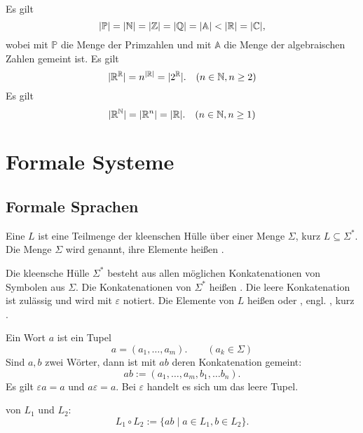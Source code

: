 Es gilt
\begin{equation}
|\mathbb P| = |\mathbb N| = |\mathbb Z| = |\mathbb Q| = |\mathbb A| < |\mathbb R| = |\mathbb C|,
\end{equation}
wobei mit $\mathbb P$ die Menge der Primzahlen und mit $\mathbb A$ die
Menge der algebraischen Zahlen gemeint ist. Es gilt
\begin{equation}
|\mathbb R^\mathbb R| = n^{|\mathbb R|} = |2^\mathbb R|.\quad (n\in\mathbb N, n\ge 2)
\end{equation}
Es gilt
\begin{equation}
|\mathbb R^\mathbb N| = |\mathbb R^n| = |\mathbb R|.\quad (n\in\mathbb N, n\ge 1)
\end{equation}

\newpage
\section{Formale Systeme}
\subsection{Formale Sprachen}
\begin{definition}\mbox{}\newline
Eine  $L$ ist eine Teilmenge der kleenschen
Hülle über einer Menge $\Sigma$, kurz $L\subseteq\Sigma^*$.
Die Menge $\Sigma$ wird  genannt,
ihre Elemente heißen .

Die kleensche Hülle $\Sigma^*$ besteht aus allen möglichen
Konkatenationen von Symbolen aus $\Sigma$. Die Konkatenationen
von $\Sigma^*$ heißen . Die leere Konkatenation ist
zulässig und wird mit $\varepsilon$ notiert. Die Elemente von $L$ heißen
 oder ,
engl. , kurz .
\end{definition}

\noindent
Ein Wort $a$ ist ein Tupel
\begin{equation}
a = (a_1,\ldots, a_m).\qquad (a_k\in\Sigma)
\end{equation}
Sind $a,b$ zwei Wörter, dann ist mit $ab$ deren Konkatenation
gemeint:
\begin{equation}
ab := (a_1,\ldots,a_m,b_1,\ldots b_n).
\end{equation}
Es gilt $\varepsilon a=a$ und $a\varepsilon=a$.
Bei $\varepsilon$ handelt es sich um das leere Tupel.

\begin{definition}\mbox{}\newline
{} von $L_1$ und $L_2$:
\begin{equation}
L_1\circ L_2 := \{ab\mid a\in L_1, b\in L_2\}.
\end{equation}
\end{definition}

